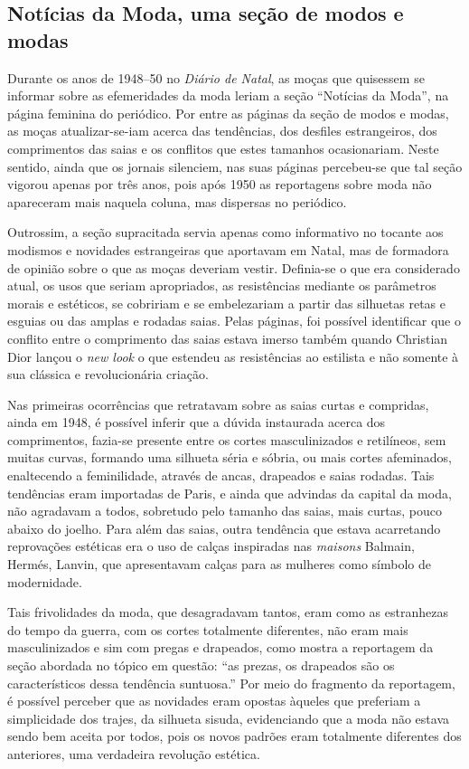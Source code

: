 \begin{refsection}
    \section{Notícias da Moda, uma seção de modos e modas}

    \nocite{NoticiasDaModa1948janeiro}

    Durante os anos de 1948--50 no \textit{Diário de Natal}, as moças que quisessem se informar sobre as efemeridades da moda leriam a seção ``Notícias da Moda'', na página feminina do periódico. Por entre as páginas da seção de modos e modas, as moças atualizar-se-iam acerca das tendências, dos desfiles estrangeiros, dos comprimentos das saias e os conflitos que estes tamanhos ocasionariam. Neste sentido, ainda que os jornais silenciem, nas suas páginas percebeu-se que tal seção vigorou apenas por três anos, pois após 1950 as reportagens sobre moda não apareceram mais naquela coluna, mas dispersas no periódico.

    Outrossim, a seção supracitada servia apenas como informativo no tocante aos modismos e novidades estrangeiras que aportavam em Natal, mas de formadora de opinião sobre o que as moças deveriam vestir. Definia-se o que era considerado atual, os usos que seriam apropriados, as resistências mediante os parâmetros morais e estéticos, se cobririam e se embelezariam a partir das silhuetas retas e esguias ou das amplas e rodadas saias. Pelas páginas, foi possível identificar que o conflito entre o comprimento das saias estava imerso também quando Christian Dior lançou o \textit{new look} o que estendeu as resistências ao estilista e não somente à sua clássica e revolucionária criação. 

    Nas primeiras ocorrências que retratavam sobre as saias curtas e compridas, ainda em 1948, é possível inferir que a dúvida instaurada acerca dos comprimentos, fazia-se presente entre os cortes masculinizados e retilíneos, sem muitas curvas, formando uma silhueta séria e sóbria, ou mais cortes afeminados, enaltecendo a feminilidade, através de ancas, drapeados e saias rodadas. Tais tendências eram importadas de Paris, e ainda que advindas da capital da moda, não agradavam a todos, sobretudo pelo tamanho das saias, mais curtas, pouco abaixo do joelho. Para além das saias, outra tendência que estava acarretando reprovações estéticas era o uso de calças inspiradas nas \textit{maisons} Balmain, Hermés, Lanvin, que apresentavam calças para as mulheres como símbolo de modernidade.

    Tais frivolidades da moda, que desagradavam tantos, eram como as estranhezas do tempo da guerra, com os cortes totalmente diferentes, não eram mais masculinizados e sim com pregas e drapeados, como mostra a reportagem da seção abordada no tópico em questão: ``as prezas, os drapeados são os característicos dessa tendência suntuosa.'' Por meio do fragmento da reportagem, é possível perceber que as novidades eram opostas àqueles que preferiam a simplicidade dos trajes, da silhueta sisuda, evidenciando que a moda não estava sendo bem aceita por todos, pois os novos padrões eram totalmente diferentes dos anteriores, uma verdadeira revolução estética.  


\end{refsection}
